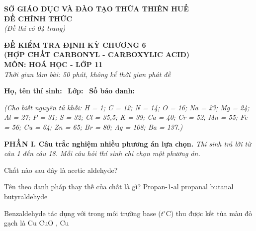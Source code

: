 \documentclass[12pt,a4paper]{article}
\begin{document}
\thispagestyle{firstpage}

\noindent
\begin{minipage}[t]{0.44\textwidth}
	\centering\fontsize{10pt}{12pt}\selectfont
	\textbf{SỞ GIÁO DỤC VÀ ĐÀO TẠO THỪA THIÊN HUẾ}\\
	\textbf{ĐỀ CHÍNH THỨC}\\
	\textit{(Đề thi có 04 trang)}
\end{minipage}\hfill
\begin{minipage}[t]{0.54\textwidth}
	\centering\fontsize{10.5pt}{13pt}\selectfont
	\textbf{ĐỀ KIỂM TRA ĐỊNH KỲ CHƯƠNG 6}\\
	\textbf{(HỢP CHẤT CARBONYL - CARBOXYLIC ACID)}\\
	\textbf{MÔN: HOÁ HỌC - LỚP 11}\\
	\textit{Thời gian làm bài: 50 phút, không kể thời gian phát đề}
	
	\smallskip
\end{minipage}

\smallskip
\noindent\hrulefill
\smallskip

\noindent\textbf{Họ, tên thí sinh:} \dotfill\ \textbf{Lớp:} \dotfill\ \textbf{Số báo danh:} \dotfill

\smallskip
\noindent\textit{(Cho biết nguyên tử khối: H = 1; C = 12; N = 14; O = 16; Na = 23; Mg = 24; Al = 27; P = 31; S = 32; Cl = 35,5; K = 39; Ca = 40; Cr = 52; Mn = 55; Fe = 56; Cu = 64; Zn = 65; Br = 80; Ag = 108; Ba = 137.)}

\smallskip
\noindent\textbf{\large PHẦN I. Câu trắc nghiệm nhiều phương án lựa chọn.}
\textit{Thí sinh trả lời từ câu 1 đến câu 18. Mỗi câu hỏi thí sinh chỉ chọn một phương án.}
\vspace{0.2cm}

\begin{ex}
Chất nào sau đây là acetic aldehyde?
\choice
{}
{}
{}
{}
\end{ex}

\begin{ex}
Tên theo danh pháp thay thế của chất  là gì?
\choice
{Propan-1-al}
{propanal}
{butanal}
{butyraldehyde}
\end{ex}

\begin{ex}
Benzaldehyde tác dụng với  trong môi trường base ($t^\circ\text{C}$) thu được kết tủa màu đỏ gạch là
\choice
{Cu}
{}
{CuO}
{, Cu}
\end{ex}
\end{document}
